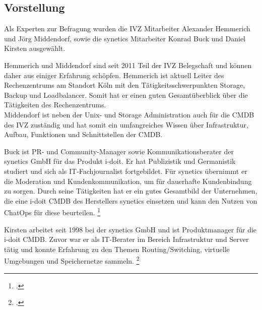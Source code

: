 \subsection{Vorstellung}
Als Experten zur Befragung wurden die \acs{IVZ} Mitarbeiter Alexander Hemmerich und Jörg Middendorf, sowie die synetics Mitarbeiter Konrad Buck und Daniel Kirsten ausgewählt.

Hemmerich und Middendorf sind seit 2011 Teil der \acs{IVZ} Belegschaft und können daher aus einiger Erfahrung schöpfen. Hemmerich ist aktuell Leiter des Rechenzentrums am Standort Köln mit den Tätigkeitsschwerpunkten Storage, Backup und Loadbalancer. Somit hat er einen guten Gesamtüberblick über die Tätigkeiten des Rechenzentrums.\\
Middendorf ist neben der Unix- und Storage Administration auch für die \acs{CMDB} des \acs{IVZ} zuständig und hat somit ein umfangreiches Wissen über Infrastruktur, Aufbau, Funktionen und Schnittstellen der \acs{CMDB}.


Buck ist PR- und Community-Manager sowie Kommunikationsberater der synetics GmbH für das Produkt i-doit. Er hat  Publizistik und Germanistik studiert und sich als IT-Fachjournalist fortgebildet. Für synetics übernimmt er die Moderation und Kundenkommunikation, um für dauerhafte Kundenbindung zu sorgen. Durch seine Tätigkeiten hat er ein gutes Gesamtbild der Unternehmen, die eine i-doit \acs{CMDB} des Herstellers synetics einsetzen und kann den Nutzen von ChatOps für diese beurteilen. 
\footcites[Vgl.][o. \pno]{Buck_2018_Allgemein}[Vgl.][o. \pno]{Buck_2018_Referenzen}

Kirsten arbeitet seit 1998 bei der synetics GmbH und ist Produktmanager für die i-doit \acs{CMDB}. Zuvor war er als IT-Berater im Bereich Infrastruktur und Server tätig und konnte Erfahrung zu den Themen Routing/Switching, virtuelle Umgebungen und Speichernetze sammeln.
\footcite[Vgl.][o. \pno]{Kirsten_2017}

